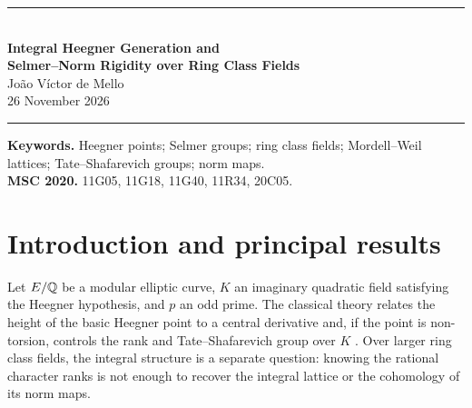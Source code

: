 \documentclass[11pt,a4paper]{article}
\numberwithin{equation}{section}
\begin{document}
\thispagestyle{plain}
\begin{center}
{\color{ink}\rule{\textwidth}{0.65pt}}\\[11pt]
{\LARGE\bfseries Integral Heegner Generation and\\[3pt] Selmer--Norm Rigidity over Ring Class Fields}\\[11pt]
{\large João Víctor de Mello}\\[5pt]
{\small 26 November 2026}\\[9pt]
{\color{ink}\rule{\textwidth}{0.65pt}}
\end{center}
\begin{abstract}
We prove a finite-extension criterion for exact integral generation of Mordell--Weil lattices from residual Selmer descent and independent norms of global points. The criterion gives a regular-representation summand over the integral group ring of any finite $p$-group. Applied to Heegner traces at inert auxiliary primes with $p\mid \ell+1$ and $p\nmid a_\ell(E)$, it gives exact ranks, a free rank-one Galois lattice, and vanishing of the $p$-primary Tate--Shafarevich group at every finite layer, under explicit base-field hypotheses. We obtain compatible generators in composita of squarefree ring class fields, rank equality with the analytic order via Gross--Zagier, and a uniform modular-degree bound for generation on the elliptic isotypic component of a modular Jacobian. An explicit application to $37\mathrm{a}1$ at $p=5$ gives an extension of degree $625$ with rank $625$ and trivial $5$-primary Tate--Shafarevich group. We also isolate the residual local obstruction at classical Kolyvagin primes, where the unit-norm argument does not apply. The results concern a restricted, but infinite, arithmetic family and do not establish the general Birch and Swinnerton-Dyer conjecture.
\end{abstract}
\noindent\textbf{Keywords.} Heegner points; Selmer groups; ring class fields; Mordell--Weil lattices; Tate--Shafarevich groups; norm maps.\\
\textbf{MSC 2020.} 11G05, 11G18, 11G40, 11R34, 20C05.
\section{Introduction and principal results}
Let $E/\mathbb Q$ be a modular elliptic curve, $K$ an imaginary quadratic field satisfying the Heegner hypothesis, and $p$ an odd prime. The classical theory relates the height of the basic Heegner point to a central derivative and, if the point is non-torsion, controls the rank and Tate--Shafarevich group over $K$ \cite{GZ,Kol,Gross}. Over larger ring class fields, the integral structure is a separate question: knowing the rational character ranks is not enough to recover the integral lattice or the cohomology of its norm maps.
\end{document}
